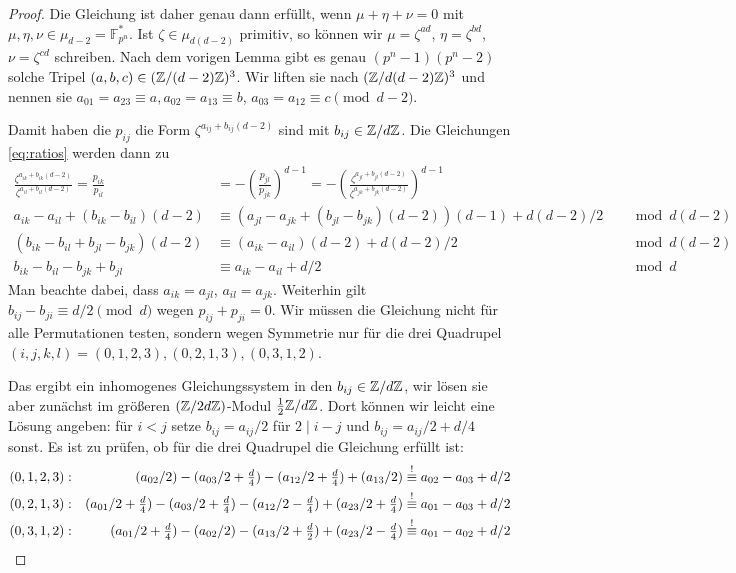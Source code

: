 \begin{proof}
Die Gleichung ist daher genau dann erfüllt, wenn $\mu+\eta+\nu = 0$ mit $\mu, \eta, \nu \in \mu_{d-2} = \mathbb F_{p^n}^*$. Ist $\zeta \in \mu_{d(d-2)}$ primitiv, so können wir $\mu = \zeta^{ad}$, $\eta = \zeta^{bd}$, $\nu = \zeta^{cd}$ schreiben. Nach dem vorigen Lemma gibt es genau $(p^n-1)(p^n-2)$ solche Tripel $(a,b,c) \in (\Zmod (d-2)Z)^3$. Wir liften sie nach $(\Zmod d(d-2)Z)^3$ und nennen sie $a_{01} = a_{23} \equiv a, a_{02} = a_{13} \equiv b$, $a_{03} = a_{12} \equiv c \pmod{d-2}$.

Damit haben die $p_{ij}$ die Form $\zeta^{a_{ij} + b_{ij}(d-2)}$ sind mit $b_{ij} \in \Zmod dZ$. Die Gleichungen \eqref{eq:ratios} werden dann zu
\begin{align*}
\frac{\zeta^{a_{ik} + b_{ik}(d-2)}}{\zeta^{a_{il} + b_{il}(d-2)}} = \frac{p_{ik}}{p_{il}} &= -\left(\frac{p_{jl}}{p_{jk}}\right)^{d-1} = -\left(\frac{\zeta^{a_{jl} + b_{jl}(d-2)}}{\zeta^{a_{jk} + b_{jk}(d-2)}}\right)^{d-1} \\
a_{ik} - a_{il} + (b_{ik} - b_{il})(d-2) &\equiv (a_{jl} - a_{jk} + (b_{jl} - b_{jk})(d-2))(d-1) + d(d-2)/2 &&\mod{d(d-2)} \\
(b_{ik} - b_{il} + b_{jl} - b_{jk})(d-2) &\equiv (a_{ik} - a_{il})(d-2) + d(d-2)/2 &&\mod{d(d-2)} \\
b_{ik} - b_{il} - b_{jk} + b_{jl} &\equiv a_{ik} - a_{il} + d/2 &&\mod d
\end{align*}
Man beachte dabei, dass $a_{ik} = a_{jl}$, $a_{il} = a_{jk}$. Weiterhin gilt $b_{ij} - b_{ji} \equiv d/2 \pmod d$ wegen $p_{ij} + p_{ji} = 0$. Wir müssen die Gleichung nicht für alle Permutationen testen, sondern wegen Symmetrie nur für die drei Quadrupel $(i,j,k,l) = (0,1,2,3), (0,2,1,3), (0,3,1,2)$.

Das ergibt ein inhomogenes Gleichungssystem in den $b_{ij} \in \Zmod dZ$, wir lösen sie aber zunächst im größeren $(\Zmod 2dZ)$-Modul $\frac 12 \Zmod dZ$. Dort können wir leicht eine Lösung angeben: für $i<j$ setze $b_{ij} = a_{ij}/2$ für $2 \mid i-j$ und $b_{ij} = a_{ij}/2 + d/4$ sonst. Es ist zu prüfen, ob für die drei Quadrupel die Gleichung erfüllt ist:
\begin{align*}
&(0,1,2,3): &(a_{02}/2) - (a_{03}/2+\tfrac d4) - (a_{12}/2+\tfrac d4) + (a_{13}/2) &\overrel{\equiv}^! a_{02} - a_{03} + d/2 \\
&(0,2,1,3): &(a_{01}/2+\tfrac d4) - (a_{03}/2+\tfrac d4) - (a_{12}/2-\tfrac d4) + (a_{23}/2+\tfrac d4) &\overrel{\equiv}^! a_{01} - a_{03} + d/2 \\
&(0,3,1,2): &(a_{01}/2+\tfrac d4) - (a_{02}/2) - (a_{13}/2+\tfrac d2) + (a_{23}/2-\tfrac d4) &\overrel{\equiv}^! a_{01} - a_{02} + d/2
\end{align*}


\end{proof}
